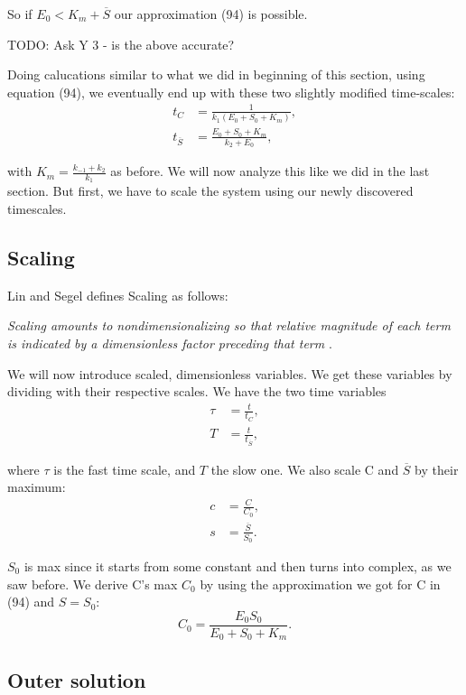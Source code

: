 \documentclass[12pt]{article}
\begin{document}
So if $E_0 < K_m + \overline{S}$ our approximation (94) is possible.

TODO: Ask Y 3 - is the above accurate?

Doing calucations similar to what we did in beginning of this section,
using equation (94), we eventually end up with these two slightly
modified time-scales:
\begin{align}
t_C &= \frac{1}{k_1(E_0+S_0+K_m)}, \\
t_{\overline{S}} &= \frac{E_0+S_0+K_m}{k_2+E_0},
\end{align}

with $K_m = \frac{k_{-1}+k_2}{k_1}$ as before. We will now analyze this
like we did in the last section. But first, we have to scale the
system using our newly discovered timescales.

\subsection{Scaling}

Lin and Segel defines Scaling as follows:

\textit{Scaling amounts to nondimensionalizing so that relative magnitude of
each term is indicated by a dimensionless factor preceding that term}
\cite{lin1974mathematics}.

We will now introduce scaled, dimensionless variables. We get these variables by
dividing with their respective scales. We have the two time variables
\begin{align}
\tau &= \frac{t}{t_C}, \\
T &= \frac{t}{t_{\overline{S}}},
\end{align}

where $\tau$ is the fast time scale, and $T$ the slow one. We also
scale C and $\overline{S}$ by their maximum:
\begin{align}
c &= \frac{C}{C_0}, \\
s &= \frac{\overline{S}}{S_0}.
\end{align}

$S_0$ is max since it starts from some constant and then turns into
complex, as we saw before. We derive C's max $C_0$ by using the
approximation we got for C in (94) and $S=S_0$:
\begin{equation}
C_0 = \frac{E_0 S_0}{E_0 + S_0 + K_m}.
\end{equation}

\subsection{Outer solution}
\end{document}
